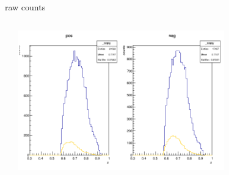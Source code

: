 \begin{frame}{raw counts}
\begin{columns}
\begin{column}[T]{0.5\textwidth}
\end{column}
\begin{column}[T]{0.5\textwidth}
\includegraphics[width = 0.7\textwidth]{results/yield/statistics/counts_x_Q2_z_0.55_4.764_0.70.png}
\end{column}
\end{columns}
\end{frame}
